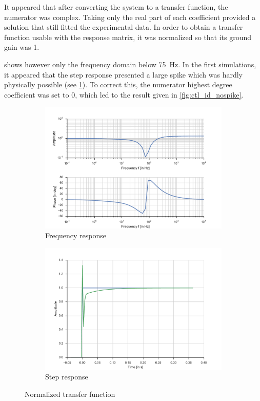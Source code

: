 It appeared that after converting the system to a transfer function, the numerator was complex. Taking only the real part of each coefficient provided a solution that still fitted the experimental data. In order to obtain a transfer function usable with the response matrix, it was normalized so that its ground gain was 1.

 shows however only the frequency domain below \SI{75}{\hertz}. In the first simulations, it appeared that the step response presented a large spike which was hardly physically possible (see \cref{fig:ctl_id_spike}). To correct this, the numerator highest degree coefficient was set to 0, which led to the result given in \cref{fig:ctl_id_nospike}. 

\begin{figure}
	\begin{subfigure}[t]{0.5\linewidth}
		\includegraphics[width=1\linewidth]{img/ctl_id_3z}
		\caption{Frequency response}
	\end{subfigure}
	\hfill
	\begin{subfigure}[t]{0.5\linewidth}
		\includegraphics[width=1\linewidth]{img/ctl_id_3z_step}
		\caption{Step response}
	\end{subfigure}
	\caption{\label{fig:ctl_id_spike}Normalized transfer function}
\end{figure}

